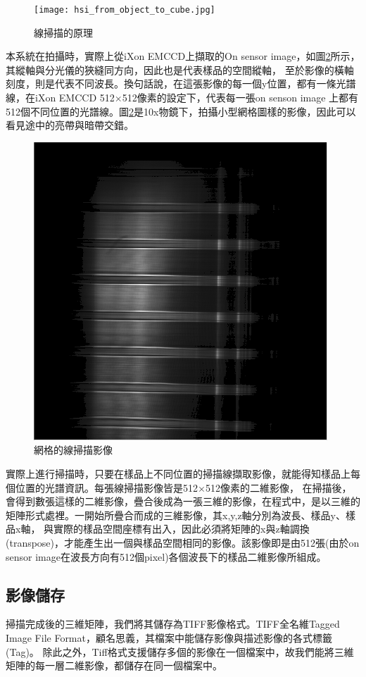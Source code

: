\documentclass[12pt]{article}
\begin{document}
    \begin{figure}[t]
        \centering
        \texttt{[image: hsi\_from\_object\_to\_cube.jpg]}
        \caption{線掃描的原理}
        \label{figure: lineScan}
    \end{figure}

    本系統在拍攝時，實際上從iXon EMCCD上擷取的On sensor image，如圖\ref{figure: linespectrum}所示，其縱軸與分光儀的狹縫同方向，因此也是代表樣品的空間縱軸，
    至於影像的橫軸刻度，則是代表不同波長。換句話說，在這張影像的每一個y位置，都有一條光譜線，在iXon EMCCD 512$\times$512像素的設定下，代表每一張on senson image
    上都有512個不同位置的光譜線。圖\ref{figure: linespectrum}是10x物鏡下，拍攝小型網格圖樣的影像，因此可以看見途中的亮帶與暗帶交錯。

    \begin{figure}[t]
        \centering
        \includegraphics[width=0.5\linewidth]{lineSpectrum1213LDLS.png}
        \caption{網格的線掃描影像}
        \label{figure: linespectrum}
    \end{figure}

    實際上進行掃描時，只要在樣品上不同位置的掃描線擷取影像，就能得知樣品上每個位置的光譜資訊。每張線掃描影像皆是512$\times$512像素的二維影像，
    在掃描後，會得到數張這樣的二維影像，疊合後成為一張三維的影像，在程式中，是以三維的矩陣形式處裡。一開始所疊合而成的三維影像，其x,y,z軸分別為波長、樣品y、樣品x軸，
    與實際的樣品空間座標有出入，因此必須將矩陣的x與z軸調換(transpose)，才能產生出一個與樣品空間相同的影像。該影像即是由512張(由於on sensor image在波長方向有512個pixel)各個波長下的樣品二維影像所組成。

    \subsection{影像儲存}
    掃描完成後的三維矩陣，我們將其儲存為TIFF影像格式。TIFF全名維Tagged Image File Format，顧名思義，其檔案中能儲存影像與描述影像的各式標籤(Tag)。
    除此之外，Tiff格式支援儲存多個的影像在一個檔案中，故我們能將三維矩陣的每一層二維影像，都儲存在同一個檔案中。
\end{document}
